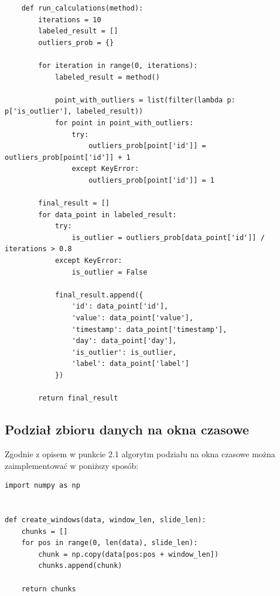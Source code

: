 \documentclass[eng,printmode]{mgr}
\begin{document}
\begin{lstlisting}
    def run_calculations(method):
        iterations = 10
        labeled_result = []
        outliers_prob = {}

        for iteration in range(0, iterations):
            labeled_result = method()

            point_with_outliers = list(filter(lambda p: p['is_outlier'], labeled_result))
            for point in point_with_outliers:
                try:
                    outliers_prob[point['id']] = outliers_prob[point['id']] + 1
                except KeyError:
                    outliers_prob[point['id']] = 1

        final_result = []
        for data_point in labeled_result:
            try:
                is_outlier = outliers_prob[data_point['id']] / iterations > 0.8
            except KeyError:
                is_outlier = False

            final_result.append({
                'id': data_point['id'],
                'value': data_point['value'],
                'timestamp': data_point['timestamp'],
                'day': data_point['day'],
                'is_outlier': is_outlier,
                'label': data_point['label']
            })

        return final_result
\end{lstlisting}


\subsection{Podział zbioru danych na okna czasowe}
Zgodnie z opisem w punkcie 2.1 algorytm podziału na okna czasowe można zaimplementować w poniższy sposób:
\begin{lstlisting}
import numpy as np


def create_windows(data, window_len, slide_len):
    chunks = []
    for pos in range(0, len(data), slide_len):
        chunk = np.copy(data[pos:pos + window_len])
        chunks.append(chunk)

    return chunks
\end{lstlisting}
\end{document}
